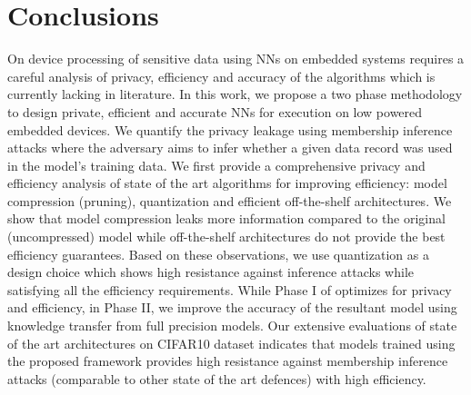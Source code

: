 \section{Conclusions}\label{conclusions}

On device processing of sensitive data using NNs on embedded systems requires a careful analysis of privacy, efficiency and accuracy of the algorithms which is currently lacking in literature.
In this work, we propose a two phase \method\hspace{0.02in} methodology to design private, efficient and accurate NNs for execution on low powered embedded devices.
We quantify the privacy leakage using membership inference attacks where the adversary aims to infer whether a given data record was used in the model's training data.
We first provide a comprehensive privacy and efficiency analysis of state of the art algorithms for improving efficiency: model compression (pruning), quantization and efficient off-the-shelf architectures.
We show that model compression leaks more information compared to the original (uncompressed) model while off-the-shelf architectures do not provide the best efficiency guarantees.
Based on these observations, we use quantization as a design choice which shows high resistance against inference attacks while satisfying all the efficiency requirements.
While Phase I of \method\hspace{0.02in} optimizes for privacy and efficiency, in Phase II, we improve the accuracy of the resultant model using knowledge transfer from full precision models.
Our extensive evaluations of state of the art architectures on CIFAR10 dataset indicates that models trained using the proposed framework provides high resistance against membership inference attacks (comparable to other state of the art defences) with high efficiency.
